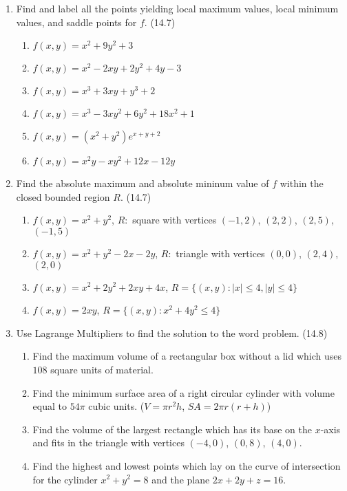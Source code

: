 \begin{enumerate}
    \newpage

    \item Find and label all the points yielding local maximum values, local minimum values, and saddle points for $f$. (14.7)

      \begin{enumerate}
        \item $f(x,y)=x^2+9y^2+3$
        \item $f(x,y)=x^2-2xy+2y^2+4y-3$
        \item $f(x,y)=x^3+3xy+y^3+2$
        \item $f(x,y)=x^3-3xy^2+6y^2+18x^2+1$
        \item $f(x,y)=(x^2+y^2)e^{x+y+2}$
        \item $f(x,y)=x^2y-xy^2+12x-12y$
      \end{enumerate}

    \item Find the absolute maximum and absolute mininum value of $f$ within the closed bounded region $R$. (14.7)

      \begin{enumerate}
        \item $f(x,y)=x^2+y^2$, $R:$ square with vertices $(-1,2)$, $(2,2)$, $(2,5)$, $(-1,5)$
        \item $f(x,y)=x^2+y^2-2x-2y$, $R:$ triangle with vertices $(0,0)$, $(2,4)$, $(2,0)$
        \item $f(x,y)=x^2+2y^2+2xy+4x$, $R = \{(x,y):|x|\leq4,|y|\leq4\}$
        \item $f(x,y)=2xy$, $R = \{(x,y):x^2+4y^2\leq 4\}$
      \end{enumerate}

    \item Use Lagrange Multipliers to find the solution to the word problem. (14.8)

      \begin{enumerate}
        \item Find the maximum volume of a rectangular box without a lid which uses $108$ square units of material.
        \item Find the minimum surface area of a right circular cylinder with volume equal to $54\pi$ cubic units. ($V=\pi r^2h$, $SA=2\pi r(r+h)$)
        \item Find the volume of the largest rectangle which has its base on the $x$-axis and fits in the triangle with vertices $(-4,0)$, $(0,8)$, $(4,0)$.
        \item Find the highest and lowest points which lay on the curve of intersection for the cylinder $x^2+y^2=8$ and the plane $2x+2y+z=16$.
      \end{enumerate}


\end{enumerate}
